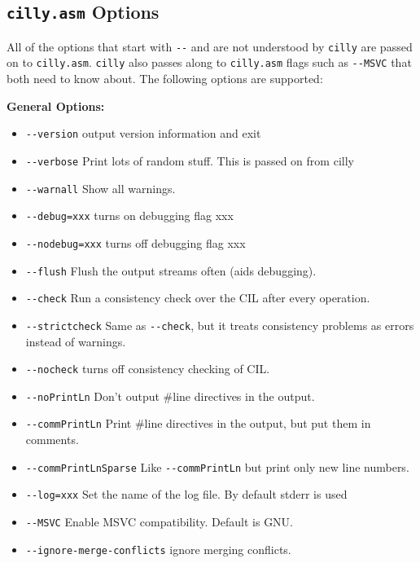 \documentclass{article}
\def\t#1{{\tt #1}}
\begin{document}
 
  \subsection{\t{cilly.asm} Options}
  \label{sec-cilly-asm-options}

 All of the options that start with \t{-{}-} and are not understood by
\t{cilly} are passed on to \t{cilly.asm}.   \t{cilly} also passes along to
\t{cilly.asm} flags such as \t{-{}-MSVC} that both need to know
about.  The following options are supported:

\hspace*{2cm} {\bf General Options:}
\begin{itemize}
  \item \t{-{}-version} output version information and exit
  \item \t{-{}-verbose} Print lots of random stuff. This is passed on from cilly
  \item \t{-{}-warnall} Show all warnings.
  \item \t{-{}-debug=xxx} turns on debugging flag xxx
  \item \t{-{}-nodebug=xxx} turns off debugging flag xxx
  \item \t{-{}-flush} Flush the output streams often (aids debugging).
  \item \t{-{}-check} Run a consistency check over the CIL after every operation.
  \item \t{-{}-strictcheck} Same as \t{-{}-check}, but it treats
    consistency problems as errors instead of warnings.
  \item \t{-{}-nocheck} turns off consistency checking of CIL.
  \item \t{-{}-noPrintLn} Don't output \#line directives in the output.
  \item \t{-{}-commPrintLn} Print \#line directives in the output, but
    put them in comments.
  \item \t{-{}-commPrintLnSparse} Like \t{-{}-commPrintLn} but print only new
         line numbers.
  \item \t{-{}-log=xxx} Set the name of the log file.  By default stderr is used
  \item \t{-{}-MSVC} Enable MSVC compatibility. Default is GNU.
  \item \t{-{}-ignore-merge-conflicts} ignore merging conflicts.

\end{itemize}
\end{document}
